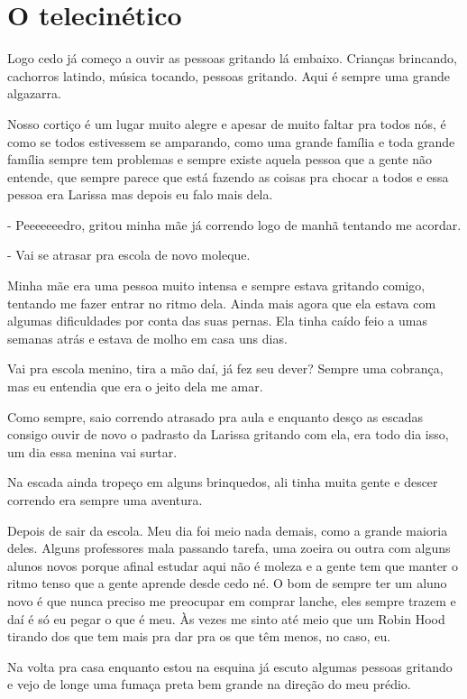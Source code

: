 \chapter{O telecinético}
Logo cedo já começo a ouvir as pessoas gritando lá embaixo. Crianças brincando, cachorros latindo, música tocando, pessoas gritando. Aqui é sempre uma grande algazarra.

Nosso cortiço é um lugar muito alegre e apesar de muito faltar pra todos nós, é como se todos estivessem se amparando, como uma grande família e toda grande família sempre tem problemas e sempre existe aquela pessoa que a gente não entende, que sempre parece que está fazendo as coisas pra chocar a todos e essa pessoa era Larissa mas depois eu falo mais dela.

- Peeeeeeedro, gritou minha mãe já correndo logo de manhã tentando me acordar.

- Vai se atrasar pra escola de novo moleque.

Minha mãe era uma pessoa muito intensa e sempre estava gritando comigo, tentando me fazer entrar no ritmo dela. Ainda mais agora que ela estava com algumas dificuldades por conta das suas pernas. Ela tinha caído feio a umas semanas atrás e estava de molho em casa uns dias.

Vai pra escola menino, tira a mão daí, já fez seu dever? Sempre uma cobrança, mas eu entendia que era o jeito dela me amar.

Como sempre, saio correndo atrasado pra aula e enquanto desço as escadas consigo ouvir de novo o padrasto da Larissa gritando com ela, era todo dia isso, um dia essa menina vai surtar.

Na escada ainda tropeço em alguns brinquedos, ali tinha muita gente e descer correndo era sempre uma aventura.

Depois de sair da escola. Meu dia foi meio nada demais, como a grande maioria deles. Alguns professores mala passando tarefa, uma zoeira ou outra com alguns alunos novos porque afinal estudar aqui não é moleza e a gente tem que manter o ritmo tenso que a gente aprende desde cedo né. O bom de sempre ter um aluno novo é que nunca preciso me preocupar em comprar lanche, eles sempre trazem e daí é só eu pegar o que é meu. Às vezes me sinto até meio que um Robin Hood tirando dos que tem mais pra dar pra os que têm menos, no caso, eu.

Na volta pra casa enquanto estou na esquina já escuto algumas pessoas gritando e vejo de longe uma fumaça preta bem grande na direção do meu prédio.

